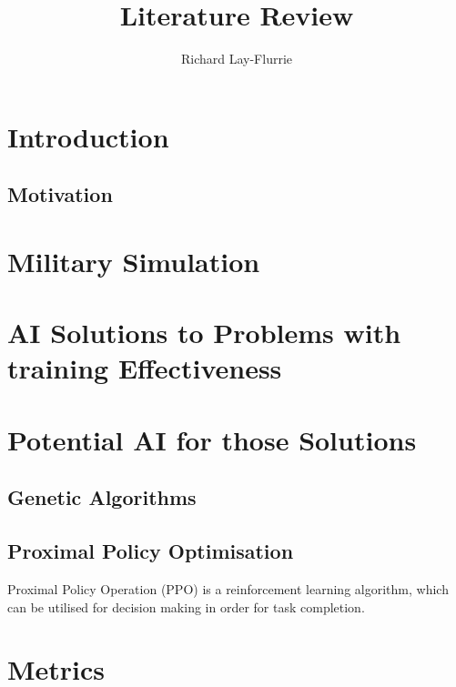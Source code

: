 \documentclass{article}
\title{Literature Review}
\author{Richard Lay-Flurrie}
\begin{document}
\maketitle

\tableofcontents



\section{Introduction}

\subsection{Motivation}

\section{Military Simulation}

\section{AI Solutions to Problems with training Effectiveness}

\section{Potential AI for those Solutions}

\subsection{Genetic Algorithms}

\subsection{Proximal Policy Optimisation}

Proximal Policy Operation (PPO) is a reinforcement learning algorithm, which can be utilised for decision making in order for task completion. \cite{schulman2017proximal}

\section{Metrics}

{}

\end{document}
